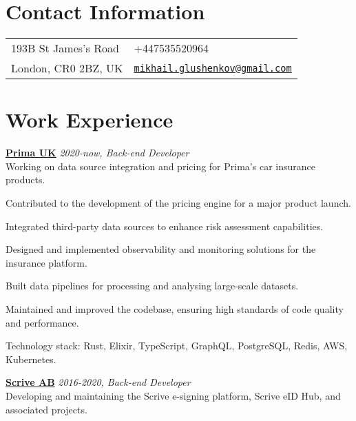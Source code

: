 \documentclass[margin,line]{res}
\begin{document}

\begin{resume}
    \section{\sc Contact Information}
    \vspace{.05in}
    \begin{tabular}{@{}p{2in}p{4in}}
        193B St James's Road &
        +447535520964                           \\
        London, CR0 2BZ, UK  &
        \href{mailto:mikhail.glushenkov@gmail.com}
        {\texttt{mikhail.glushenkov@gmail.com}} \\
    \end{tabular}


    \section{\sc Work Experience}

     {\bf \href{https://helloprima.co.uk}{Prima UK}} \hfill {\it 2020-now, Back-end Developer}\\
    Working on data source integration and pricing for Prima's car insurance products.\\
    \begin{list}{}{\leftmargin=1.5em}
        \item Contributed to the development of the pricing engine for a major product launch.
        \item Integrated third-party data sources to enhance risk assessment capabilities.
        \item Designed and implemented observability and monitoring solutions for the insurance platform.
        \item Built data pipelines for processing and analysing large-scale datasets.
        \item Maintained and improved the codebase, ensuring high standards of code quality and performance.
    \end{list}
    Technology stack: Rust, Elixir, TypeScript, GraphQL, PostgreSQL, Redis, AWS, Kubernetes.

        {\bf \href{https://scrive.com}{Scrive AB}} \hfill {\it 2016-2020, Back-end Developer}\\
    Developing and maintaining the Scrive e-signing platform, Scrive eID
    Hub, and associated projects.


\end{resume}
\end{document}
